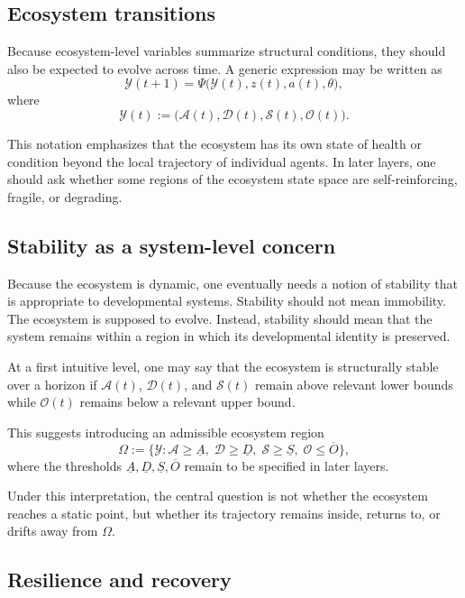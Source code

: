 \documentclass[11pt]{article}
\begin{document}
\subsection{Ecosystem transitions}

Because ecosystem-level variables summarize structural conditions, they should also be expected to evolve across time. A generic expression may be written as
\[
\mathcal{Y}(t+1) = \Psi\big(\mathcal{Y}(t), z(t), a(t), \theta\big),
\]
where
\[
\mathcal{Y}(t) := \big(\mathcal{A}(t), \mathcal{D}(t), \mathcal{S}(t), \mathcal{O}(t)\big).
\]

This notation emphasizes that the ecosystem has its own state of health or condition beyond the local trajectory of individual agents. In later layers, one should ask whether some regions of the ecosystem state space are self-reinforcing, fragile, or degrading.

\subsection{Stability as a system-level concern}

Because the ecosystem is dynamic, one eventually needs a notion of stability that is appropriate to developmental systems. Stability should not mean immobility. The ecosystem is supposed to evolve. Instead, stability should mean that the system remains within a region in which its developmental identity is preserved.

At a first intuitive level, one may say that the ecosystem is structurally stable over a horizon if \(\mathcal{A}(t)\), \(\mathcal{D}(t)\), and \(\mathcal{S}(t)\) remain above relevant lower bounds while \(\mathcal{O}(t)\) remains below a relevant upper bound.

This suggests introducing an admissible ecosystem region
\[
\Omega :=
\Big\{
\mathcal{Y} :
\mathcal{A} \geq \underline{A},\;
\mathcal{D} \geq \underline{D},\;
\mathcal{S} \geq \underline{S},\;
\mathcal{O} \leq \overline{O}
\Big\},
\]
where the thresholds \(\underline{A}, \underline{D}, \underline{S}, \overline{O}\) remain to be specified in later layers.

Under this interpretation, the central question is not whether the ecosystem reaches a static point, but whether its trajectory remains inside, returns to, or drifts away from \(\Omega\).

\subsection{Resilience and recovery}
\end{document}
